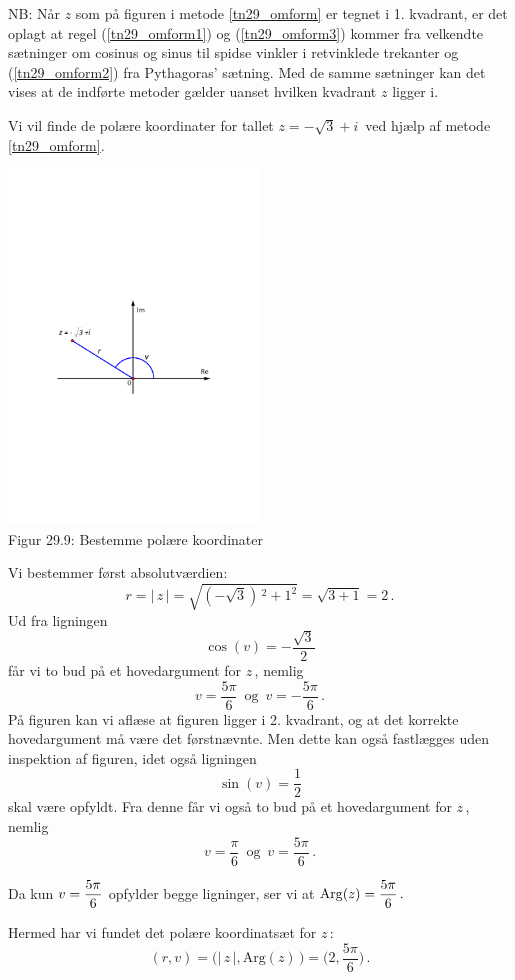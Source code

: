 \begin{aha}
NB: Når $z$ som på figuren i metode \ref{tn29_omform} er tegnet i 1. kvadrant, er det oplagt at regel (\ref{tn29_omform1}) og (\ref{tn29_omform3}) kommer fra velkendte sætninger om cosinus og sinus til spidse vinkler i retvinklede trekanter og (\ref{tn29_omform2}) fra Pythagoras' sætning. Med de samme sætninger kan det vises at de indførte metoder gælder uanset hvilken kvadrant $z$ ligger i. 
\end{aha}

\begin{example}\label{tn29_exOmform}
Vi vil finde de polære koordinater for tallet $z=-\sqrt 3+i\,$ ved hjælp af metode \ref{tn29_omform}.
\begin{center}
	\includegraphics[trim=3cm 11cm 3cm 11cm,width=0.5\textwidth,clip]{Geometer/omformning3.pdf}\\
Figur 29.9: Bestemme polære koordinater 
\end{center}

Vi bestemmer først absolutværdien:
$$
r=|\,z\,|=\sqrt{(-\sqrt 3)\,^2+1^2}=\sqrt{3+1}=2\,.
$$
Ud fra ligningen
$$\cos(v)=-\frac{\sqrt 3}2$$
får vi to bud på et hovedargument for $z\,$, nemlig
$$v=\frac{5\pi}6\,\,\,\mathrm{og}\,\,\,v=-\frac{5\pi}6\,.$$
På figuren kan vi aflæse at figuren ligger i 2. kvadrant, og at det korrekte hovedargument må være det førstnævnte. Men dette kan også fastlægges uden inspektion af figuren, idet også ligningen
$$\sin(v)=\frac12$$
skal være opfyldt. Fra denne får vi også to bud på et hovedargument for $z\,$, nemlig
$$v=\frac{\pi}6\,\,\,\mathrm{og}\,\,\,v=\frac{5\pi}6\,.$$

Da kun $\begin{displaystyle}v=\frac{5\pi}6\end{displaystyle} $ opfylder begge ligninger, ser vi at $\begin{displaystyle} \mathrm{Arg}(z)=\frac{5\pi}6\,.\end{displaystyle} $\bs

Hermed har vi fundet det polære koordinatsæt for $z\,$:
$$(r,v)=\big(|\,z\,|,\mathrm{Arg}(z)\,\big)=\big(2,\frac{5\pi}6\big)\,.$$
\end{example}

